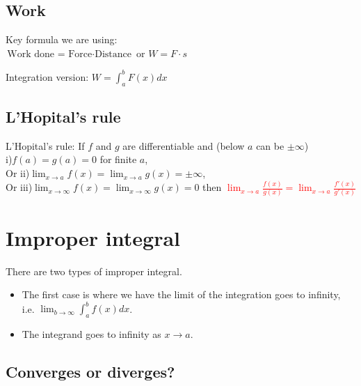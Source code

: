 \documentclass[12pt]{article}
\theoremstyle{definition}
\theoremstyle{definition}
\theoremstyle{remark}
\theoremstyle{definition}
\theoremstyle{definition}
\theoremstyle{definition}
\begin{document}
\subsection{Work}

Key formula we are using:\\
$\text{Work done = Force} \cdot \text{Distance}$ or 
$W=F\cdot s$

Integration version:
$W = \int^b_a F(x) dx$


\subsection{L'Hopital's rule}

L’Hopital’s rule: If $f$ and $g$ are differentiable and (below $a$ can be $\pm \infty$)\\
i)$f(a) = g(a) = 0$ for finite $a$, \\
Or ii)$\lim_{x\to a} f(x)=\lim_{x\to a} g(x)= \pm \infty$,\\ 
Or iii)$\lim_{x\to \infty} f(x)= \lim_{x\to \infty} g(x) = 0$
then 
\textcolor{red}{$\lim_{x\to a}\frac{f(x)}{g(x)} = \lim_{x\to a} \frac{f'(x)}{g'(x)} $}


\section{Improper integral}
There are two types of improper integral.

\begin{itemize}
	\item The first case is where we have the limit of the integration goes to infinity, i.e. $\lim_{b \to \infty} \int^b_a f(x) dx$.
	\item The integrand goes to infinity as $x \to a$.
\end{itemize}

\subsection{Converges or diverges?}
\end{document}
